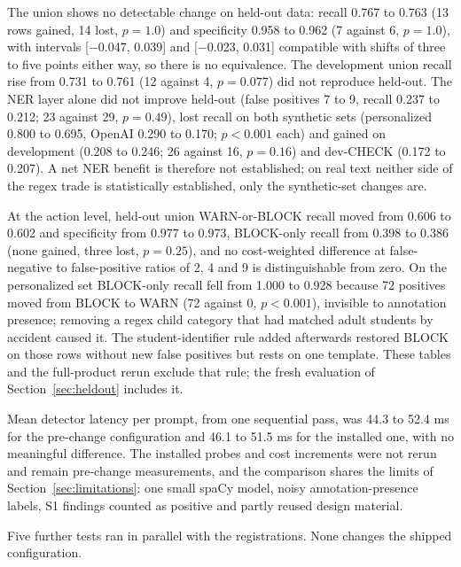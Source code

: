 \documentclass[sigconf]{acmart}
\theoremstyle{acmdefinition}\newtheorem{property}{Property}
\begin{document}
The union shows no detectable change on held-out data: recall 0.767 to 0.763 (13 rows gained, 14 lost, $p=1.0$) and specificity 0.958 to 0.962 (7 against 6, $p=1.0$), with intervals [$-$0.047, 0.039] and [$-$0.023, 0.031] compatible with shifts of three to five points either way, so there is no equivalence. The development union recall rise from 0.731 to 0.761 (12 against 4, $p=0.077$) did not reproduce held-out. The NER layer alone did not improve held-out (false positives 7 to 9, recall 0.237 to 0.212; 23 against 29, $p=0.49$), lost recall on both synthetic sets (personalized 0.800 to 0.695, OpenAI 0.290 to 0.170; $p<0.001$ each) and gained on development (0.208 to 0.246; 26 against 16, $p=0.16$) and dev-CHECK (0.172 to 0.207). A net NER benefit is therefore not established; on real text neither side of the regex trade is statistically established, only the synthetic-set changes are.

At the action level, held-out union WARN-or-BLOCK recall moved from 0.606 to 0.602 and specificity from 0.977 to 0.973, BLOCK-only recall from 0.398 to 0.386 (none gained, three lost, $p=0.25$), and no cost-weighted difference at false-negative to false-positive ratios of 2, 4 and 9 is distinguishable from zero. On the personalized set BLOCK-only recall fell from 1.000 to 0.928 because 72 positives moved from BLOCK to WARN (72 against 0, $p<0.001$), invisible to annotation presence; removing a regex child category that had matched adult students by accident caused it. The student-identifier rule added afterwards restored BLOCK on those rows without new false positives but rests on one template. These tables and the full-product rerun exclude that rule; the fresh evaluation of Section~\ref{sec:heldout} includes it.

Mean detector latency per prompt, from one sequential pass, was 44.3 to 52.4 ms for the pre-change configuration and 46.1 to 51.5 ms for the installed one, with no meaningful difference. The installed probes and cost increments were not rerun and remain pre-change measurements, and the comparison shares the limits of Section~\ref{sec:limitations}: one small spaCy model, noisy annotation-presence labels, S1 findings counted as positive and partly reused design material.

Five further tests ran in parallel with the registrations. None changes the shipped configuration.
\end{document}
